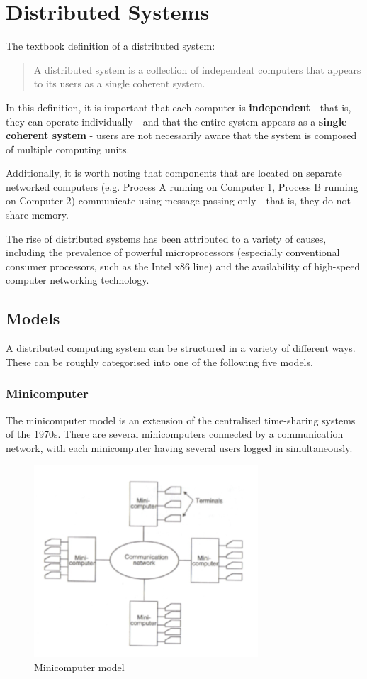 \section{Distributed Systems}
The textbook definition of a distributed system:
\begin{quote}
A distributed system is a collection of independent computers that appears to its users as a single coherent system.
\end{quote}

In this definition, it is important that each computer is \textbf{independent} - that is, they can operate individually - and that the entire system appears as a \textbf{single coherent system} - users are not necessarily aware that the system is composed of multiple computing units.

Additionally, it is worth noting that components that are located on separate networked computers (e.g. Process A running on Computer 1, Process B running on Computer 2) communicate using message passing only - that is, they do not share memory.

The rise of distributed systems has been attributed to a variety of causes, including the prevalence of powerful microprocessors (especially conventional consumer processors, such as the Intel x86 line) and the availability of high-speed computer networking technology.

\subsection{Models}
A distributed computing system can be structured in a variety of different ways. These can be roughly categorised into one of the following five models.

\subsubsection{Minicomputer}
The minicomputer model is an extension of the centralised time-sharing systems of the 1970s. There are several minicomputers connected by a communication network, with each minicomputer having several users logged in simultaneously.

\begin{figure}[h]
\centering
\includegraphics[width=0.5\linewidth]{screenshot003}
\caption{Minicomputer model}
\label{fig:screenshot003}
\end{figure}

